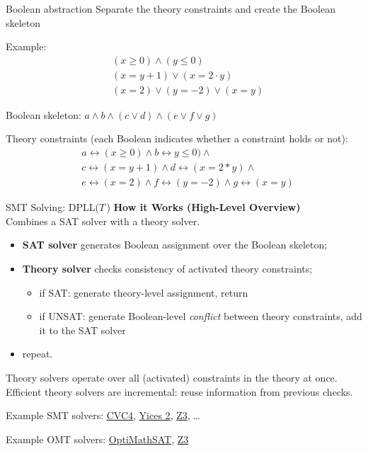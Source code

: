 \documentclass{cons-beamer}
\begin{document}
\begin{frame}{Boolean abstraction}
  Separate the theory constraints and create the Boolean skeleton
  \vfill

  Example:
  \begin{align*}
    & (x \geq 0) \land (y \leq 0) \\
    & (x = y + 1) \lor (x = 2 \cdot y) \\
    & (x = 2) \lor (y = -2) \lor (x = y)
  \end{align*}

  Boolean skeleton:
  $a \land b \land (c \lor d) \land (e \lor f \lor g)$

  Theory constraints (each Boolean indicates whether a constraint holds or not):
  \begin{align*}
    &a \leftrightarrow (x \geq 0) \land b \leftrightarrow y \leq 0) \land \\
    &c \leftrightarrow (x = y + 1) \land d \leftrightarrow (x = 2 * y) \land \\
    &e \leftrightarrow (x = 2) \land f \leftrightarrow (y = -2) \land g \leftrightarrow (x = y)
  \end{align*}
\end{frame}

\begin{frame}{SMT Solving: DPLL($T$\,)}
  \textbf{How it Works (High-Level Overview)} $ $\\
  Combines a SAT solver with a theory solver.
  \begin{itemize}
    \item \textbf{SAT solver} generates Boolean assignment over the Boolean skeleton;
    \item \textbf{Theory solver} checks consistency of activated theory constraints; \\
    \begin{itemize}
      \item if SAT: generate theory-level assignment, return
      \item if UNSAT: generate Boolean-level \textit{conflict} between theory constraints, add it to the SAT solver
    \end{itemize}
    \item repeat.
  \end{itemize}
  \vfill

  Theory solvers operate over all (activated) constraints in the theory at once. 
  Efficient theory solvers are incremental: reuse information from previous checks.
  \vfill

  Example SMT solvers: 
    \href{https://cvc4.github.io}{CVC4},
    \href{https://yices.csl.sri.com}{Yices 2},
    \href{https://github.com/Z3Prover/z3}{Z3}, \dots

  Example OMT solvers:
    \href{https://optimathsat.disi.unitn.it}{OptiMathSAT},
    \href{https://github.com/Z3Prover/z3}{Z3}
\end{frame}
\end{document}
